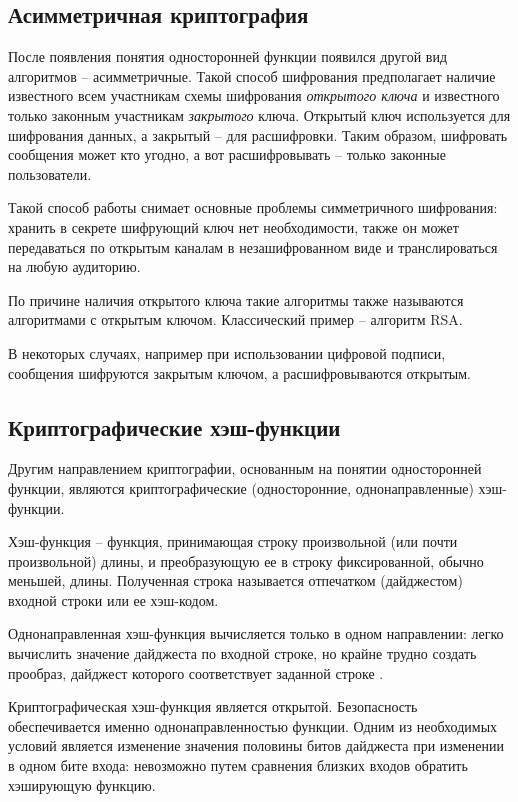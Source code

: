\subsection{Асимметричная криптография} %

После появления понятия односторонней функции появился другой вид алгоритмов – асимметричные. Такой способ шифрования предполагает наличие известного всем участникам схемы шифрования \textit{открытого ключа} и известного только законным участникам \textit{закрытого} ключа. Открытый ключ используется для шифрования данных, а закрытый – для расшифровки. Таким образом, шифровать сообщения может кто угодно, а вот расшифровывать – только законные пользователи.

Такой способ работы снимает основные проблемы симметричного шифрования: хранить в секрете шифрующий ключ нет необходимости, также он может передаваться по открытым каналам в незашифрованном виде и транслироваться на любую аудиторию.

По причине наличия открытого ключа такие алгоритмы также называются алгоритмами с открытым ключом. Классический пример – алгоритм RSA.

В некоторых случаях, например при использовании цифровой подписи, сообщения шифруются закрытым ключом, а расшифровываются открытым. 

\subsection{Криптографические хэш-функции} %

Другим направлением криптографии, основанным на понятии односторонней функции, являются криптографические (односторонние, однонаправленные) хэш-функции.

Хэш-функция – функция, принимающая строку произвольной (или почти произвольной) длины, и преобразующую ее в строку фиксированной, обычно меньшей, длины. Полученная строка называется отпечатком (дайджестом) входной строки или ее хэш-кодом.

Однонаправленная хэш-функция вычисляется только в одном направлении: легко вычислить значение дайджеста по входной строке, но крайне трудно создать прообраз, дайджест которого соответствует заданной строке \cite{src15}.

Криптографическая хэш-функция является открытой. Безопасность обеспечивается именно однонаправленностью функции. Одним из необходимых условий является изменение значения половины битов дайджеста при изменении в одном бите входа: невозможно путем сравнения близких входов обратить хэширующую функцию.


